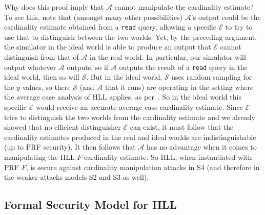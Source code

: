 \documentclass[sigconf, anonymous, dvipsnames]{acmart} %
\begin{document}
Why does this proof imply that ${\mathcal{A}}$ cannot manipulate the cardinality estimate? To see this, note that (amongst many other possibilities) ${\mathcal{A}}$'s output could be the cardinality estimate obtained from a \texttt{read} query, allowing a specific ${\mathcal{E}}$ to try to use that to distinguish between the two worlds. Yet, by the preceding argument, the simulator in the ideal world is able to produce an output that ${\mathcal{E}}$ cannot distinguish from that of ${\mathcal{A}}$ in the real world. In particular, our simulator will output whatever ${\mathcal{A}}$ outputs, so if ${\mathcal{A}}$ outputs the result of a \texttt{read} query in the ideal world, then so will ${\mathcal{S}}$. But in the ideal world, ${\mathcal{S}}$ uses random sampling for the $y$ values, so there ${\mathcal{S}}$ (and ${\mathcal{A}}$ that it runs) are operating in the setting where the average case analysis of HLL applies, as per~\cite{hll}. So in the ideal world this specific ${\mathcal{E}}$ would receive an accurate average case cardinality estimate. Since ${\mathcal{E}}$ tries to distinguish the two worlds from the cardinality estimate and we already showed that no efficient distinguisher ${{\mathcal{E}}}$ can exist, it must follow that the cardinality estimates produced in the real and ideal worlds are indistinguishable (up to PRF security). It then follows that ${\mathcal{A}}$ has no advantage when it comes to manipulating the HLL-$F$ cardinality estimate. So HLL, when instantiated with PRF $F$, is secure against cardinality manipulation attacks in S4 (and therefore in the weaker attacks models S2 and S3 as well). 


\subsection{Formal Security Model for HLL}
\end{document}
